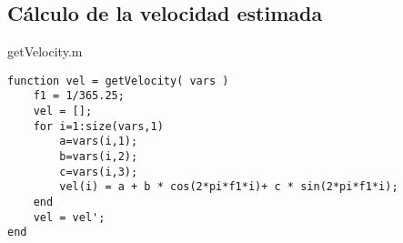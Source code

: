 \documentclass[]{article}
\begin{document}
\subsection{Cálculo de la velocidad estimada}
getVelocity.m
\begin{lstlisting}
function vel = getVelocity( vars )
	f1 = 1/365.25;
    vel = [];
	for i=1:size(vars,1)
        a=vars(i,1);
        b=vars(i,2);
        c=vars(i,3);
		vel(i) = a + b * cos(2*pi*f1*i)+ c * sin(2*pi*f1*i);
    end
    vel = vel';
end

\end{lstlisting}
\end{document}

